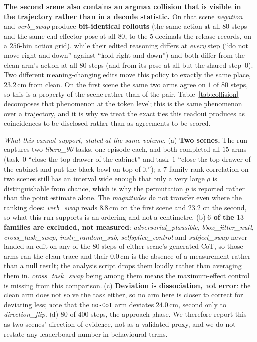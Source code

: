 \documentclass{article}
\begin{document}
\textbf{The second scene also contains an argmax collision that is visible in the trajectory rather than in a decode statistic.} On that scene \emph{negation} and \emph{verb\_swap} produce \textbf{bit-identical rollouts} (the same action at all $80$ steps and the same end-effector pose at all $80$, to the $5$ decimals the release records, on a $256$-bin action grid), while their edited reasoning differs at \emph{every} step (``do not move right and down'' against ``hold right and down'') and both differ from the clean arm's action at all $80$ steps (and from its pose at all but the shared step~$0$). Two different meaning-changing edits move this policy to exactly the same place, $23.2$\,cm from clean. On the first scene the same two arms agree on $1$ of $80$ steps, so this is a property of the scene rather than of the pair. Table~\ref{tab:collision} decomposes that phenomenon at the token level; this is the same phenomenon over a trajectory, and it is why we treat the exact ties this readout produces as coincidences to be disclosed rather than as agreements to be scored.

\emph{What this cannot support, stated at the same volume.} (a) \textbf{Two scenes.} The run captures two \emph{libero\_90} tasks, one episode each, and both completed all $15$ arms (task~$0$ ``close the top drawer of the cabinet'' and task~$1$ ``close the top drawer of the cabinet and put the black bowl on top of it''); a $7$-family rank correlation on two scenes still has an interval wide enough that only a very large $\rho$ is distinguishable from chance, which is why the permutation $p$ is reported rather than the point estimate alone. The \emph{magnitudes} do not transfer even where the ranking does: \emph{verb\_swap} reads $8.8$\,cm on the first scene and $23.2$ on the second, so what this run supports is an ordering and not a centimetre. (b) \textbf{$6$ of the $13$ families are excluded, not measured}: \emph{adversarial\_plausible}, \emph{bbox\_jitter\_null}, \emph{cross\_task\_swap}, \emph{instr\_random\_sub}, \emph{selfsplice\_control} and \emph{subject\_swap} never landed an edit on any of the $80$ steps of either scene's generated CoT, so those arms ran the clean trace and their $0.0$\,cm is the absence of a measurement rather than a null result; the analysis script drops them loudly rather than averaging them in. \emph{cross\_task\_swap} being among them means the maximum-effect control is missing from this comparison. (c) \textbf{Deviation is dissociation, not error}: the clean arm does not solve the task either, so no arm here is closer to correct for deviating less; note that the \texttt{no-CoT} arm deviates $24.0$\,cm, second only to \emph{direction\_flip}. (d) $80$ of $400$ steps, the approach phase. We therefore report this as two scenes' direction of evidence, not as a validated proxy, and we do not restate any leaderboard number in behavioural terms.
\end{document}
